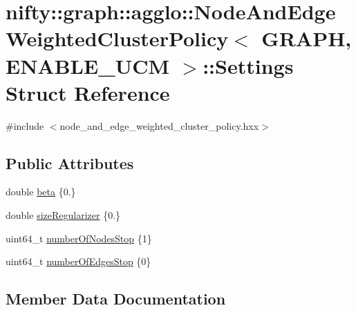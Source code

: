 \hypertarget{structnifty_1_1graph_1_1agglo_1_1NodeAndEdgeWeightedClusterPolicy_1_1Settings}{}\section{nifty\+:\+:graph\+:\+:agglo\+:\+:Node\+And\+Edge\+Weighted\+Cluster\+Policy$<$ G\+R\+A\+P\+H, E\+N\+A\+B\+L\+E\+\_\+\+U\+C\+M $>$\+:\+:Settings Struct Reference}
\label{structnifty_1_1graph_1_1agglo_1_1NodeAndEdgeWeightedClusterPolicy_1_1Settings}


{\ttfamily \#include $<$node\+\_\+and\+\_\+edge\+\_\+weighted\+\_\+cluster\+\_\+policy.\+hxx$>$}

\subsection*{Public Attributes}
\begin{DoxyCompactItemize}
\item 
double \hyperlink{structnifty_1_1graph_1_1agglo_1_1NodeAndEdgeWeightedClusterPolicy_1_1Settings_ade69f8de403b1bb2b9bd1bab98265acd}{beta} \{0.\}
\item 
double \hyperlink{structnifty_1_1graph_1_1agglo_1_1NodeAndEdgeWeightedClusterPolicy_1_1Settings_a051fc6fd53c6f43f933dd88b025aaf3e}{size\+Regularizer} \{0.\}
\item 
uint64\+\_\+t \hyperlink{structnifty_1_1graph_1_1agglo_1_1NodeAndEdgeWeightedClusterPolicy_1_1Settings_ab3b377a180a3c360250ac6d851758065}{number\+Of\+Nodes\+Stop} \{1\}
\item 
uint64\+\_\+t \hyperlink{structnifty_1_1graph_1_1agglo_1_1NodeAndEdgeWeightedClusterPolicy_1_1Settings_aec0ed2993a74b3699f93f59ebd670031}{number\+Of\+Edges\+Stop} \{0\}
\end{DoxyCompactItemize}


\subsection{Member Data Documentation}
\hypertarget{structnifty_1_1graph_1_1agglo_1_1NodeAndEdgeWeightedClusterPolicy_1_1Settings_ade69f8de403b1bb2b9bd1bab98265acd}{}
